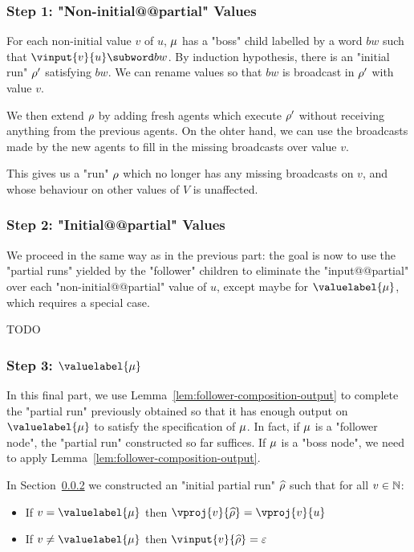\subsubsection{Step 1: "Non-initial@@partial" Values}
\label{sec:tree-to-run-step-one}

For each non-initial value $v$ of $u$, $\mu$ has a "boss" child labelled by a word $bw$ such that $\vinput{v}{u} \subword bw$.
By induction hypothesis, there is an "initial run" $\rho'$ satisfying $bw$.
We can rename values so that $bw$ is broadcast in $\rho'$ with value $v$.

We then extend $\rho$ by adding fresh agents which execute $\rho'$ without receiving anything from the previous agents. On the ohter hand, we can use the broadcasts made by the new agents to fill in the missing broadcasts over value $v$.

This gives us a "run" $\rho$ which no longer has any missing broadcasts on $v$, and whose behaviour on other values of $V$ is unaffected.

\subsubsection{Step 2: "Initial@@partial" Values}
\label{sec:tree-to-run-step-two}

We proceed in the same way as in the previous part: the goal is now to use the "partial runs" yielded by the "follower" children to eliminate the "input@@partial" over each "non-initial@@partial" value of $u$, except maybe for $\valuelabel{\node}$, which requires a special case.

\Huge TODO \normalsize

\subsubsection{Step 3: $\valuelabel{\node}$}

In this final part, we use Lemma~\ref{lem:follower-composition-output} to complete the "partial run" previously obtained so that it has enough output on $\valuelabel{\node}$ to satisfy the specification of $\mu$. In fact, if $\mu$ is a "follower node", the "partial run" constructed so far suffices. If $\mu$ is a "boss node", we need to apply Lemma~\ref{lem:follower-composition-output}.

In Section~\ref{sec:tree-to-run-step-two} we constructed an "initial partial run" $\widehat{\rho}$ such that for all $v \in \mathbb{N}$:
\begin{itemize}
	\item If $v = \valuelabel{\node}$ then $\vproj{v}{\widehat{\run}} = \vproj{v}{u}$
	
	\item If $v \neq \valuelabel{\node}$ then $\vinput{v}{\widehat{\run}} = \epsilon$
\end{itemize}  

